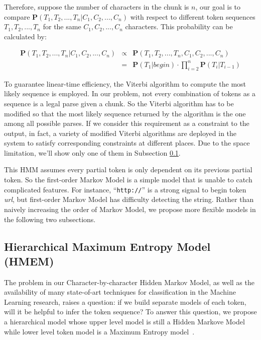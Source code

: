 Therefore, suppose the number of characters in the chunk is $n$, our
goal is to compare $\mathbf{P}(T_1, T_2, ..., T_n|C_1, C_2, ..., C_n)$
with respect to different token sequences $T_1, T_2, ..., T_n$ for the
same $C_1, C_2, ..., C_n$ characters. This probability can be
calculated by:

\begin{eqnarray*}
\mathbf{P}(T_1, T_2, ..., T_n|C_1, C_2, ..., C_n) & \propto & \mathbf{P}(T_1, T_2, ..., T_n, C_1, C_2, ..., C_n)\\
& = & \mathbf{P}(T_1|begin) \cdot
\prod_{i=2}^{n}{\mathbf{P}(T_i|T_{i-1})}
\end{eqnarray*}

To guarantee linear-time efficiency, the Viterbi algorithm to compute
the most likely sequence is employed. In our problem, not every
combination of tokens as a sequence is a legal parse given a chunk. So
the Viterbi algorithm has to be modified so that the most likely sequence
returned by the algorithm is the one among all possible parses. If we
consider this requirement as a constraint to the output, in fact, a
variety of modified Viterbi algorithms are deployed in the
\learnpads{} system to satisfy corresponding constraints at different
places. Due to the space limitation, we'll show only one of them in
Subsection \ref{subsec:hmem}.

This HMM assumes every partial token is only dependent on its previous
partial token. So the first-order Markov Model is a simple model that
is unable to catch
complicated features. For instance, ``{\tt http://}'' is a strong
signal to begin token {\em url}, but first-order Markov Model has
difficulty detecting the string. Rather than naively increasing the
order of Markov Model, we propose more flexible models in the
following two subsections.

\subsection{Hierarchical Maximum Entropy Model (HMEM)}\label{subsec:hmem}

The problem in our Character-by-character Hidden Markov Model, as
well as the availability of many state-of-art techniques for
classification in the Machine Learning research, raises a question:
if we build separate models of each token, will it be helpful to
infer the token sequence? To answer this question, we propose a
hierarchical model whose upper level model is still a Hidden Markove
Model while lower level token model is a Maximum Entropy model~\cite{Berger96:ME}\cite{megaweb}.

